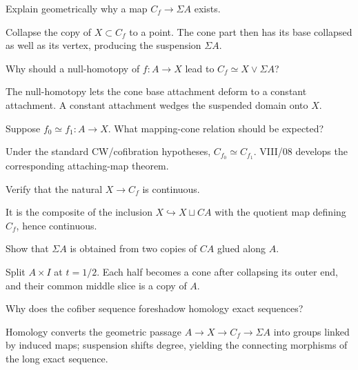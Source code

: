 \begin{problem}\label{prob:viii07-15}
Explain geometrically why a map \(C_f\to\Sigma A\) exists.
\end{problem}
\begin{solution}
Collapse the copy of \(X\subset C_f\) to a point.  The cone part then has its base collapsed as well as its vertex, producing the suspension \(\Sigma A\).
\end{solution}

\begin{problem}\label{prob:viii07-16}
Why should a null-homotopy of \(f:A\to X\) lead to \(C_f\simeq X\vee\Sigma A\)?
\end{problem}
\begin{solution}
The null-homotopy lets the cone base attachment deform to a constant attachment.  A constant attachment wedges the suspended domain onto \(X\).
\end{solution}

\begin{problem}\label{prob:viii07-17}
Suppose \(f_0\simeq f_1:A\to X\).  What mapping-cone relation should be expected?
\end{problem}
\begin{solution}
Under the standard CW/cofibration hypotheses, \(C_{f_0}\simeq C_{f_1}\).  VIII/08 develops the corresponding attaching-map theorem.
\end{solution}

\begin{problem}\label{prob:viii07-18}
Verify that the natural \(X\to C_f\) is continuous.
\end{problem}
\begin{solution}
It is the composite of the inclusion \(X\hookrightarrow X\sqcup CA\) with the quotient map defining \(C_f\), hence continuous.
\end{solution}

\begin{problem}\label{prob:viii07-19}
Show that \(\Sigma A\) is obtained from two copies of \(CA\) glued along \(A\).
\end{problem}
\begin{solution}
Split \(A\times I\) at \(t=1/2\).  Each half becomes a cone after collapsing its outer end, and their common middle slice is a copy of \(A\).
\end{solution}

\begin{problem}\label{prob:viii07-20}
Why does the cofiber sequence foreshadow homology exact sequences?
\end{problem}
\begin{solution}
Homology converts the geometric passage \(A\to X\to C_f\to\Sigma A\) into groups linked by induced maps; suspension shifts degree, yielding the connecting morphisms of the long exact sequence.
\end{solution}
